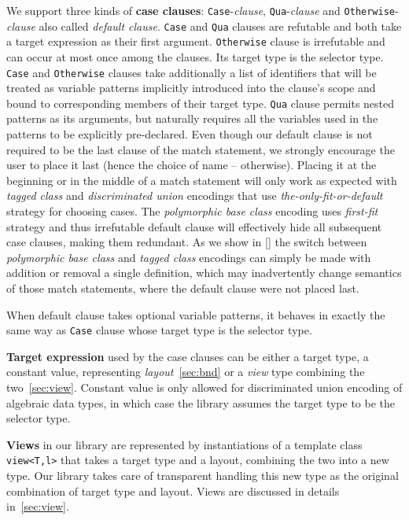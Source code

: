 \documentclass[preprint]{sigplanconf}
\makeatletter
\DeclareRobustCommand{\code}[1]{{\lstinline[breaklines=false,escapechar=@]{#1}}}
\makeatother
\begin{document}
We support three kinds of {\bf case clauses}: \code{Case}-\emph{clause}, 
\code{Qua}-\emph{clause} and \code{Otherwise}-\emph{clause} also called 
\emph{default clause}. \code{Case} and \code{Qua} clauses are refutable and both 
take a target expression as their first argument. \code{Otherwise} clause is 
irrefutable and can occur at most once among the clauses. Its target type is 
the selector type. \code{Case} and \code{Otherwise} clauses take additionally a 
list of identifiers that will be treated as variable patterns implicitly 
introduced into the clause's scope and bound to corresponding members of their 
target type. \code{Qua} clause permits nested patterns as its arguments, but 
naturally requires all the variables used in the patterns to be explicitly 
pre-declared. Even though our default clause is not required to be the last 
clause of the match statement, we strongly encourage the user to place it 
last (hence the choice of name -- otherwise). Placing it at the beginning or in 
the middle of a match statement will only work as expected with \emph{tagged 
class} and \emph{discriminated union} encodings that use 
\emph{the-only-fit-or-default} strategy for choosing cases. The 
\emph{polymorphic base class} encoding uses \emph{first-fit} strategy and thus 
irrefutable default clause will effectively hide all subsequent case 
clauses, making them redundant. As we show in \textsection\ref{} the switch 
between \emph{polymorphic base class} and \emph{tagged class} encodings can 
simply be made with addition or removal a single definition, which may 
inadvertently change semantics of those match statements, where the default 
clause were not placed last.

When default clause takes optional variable patterns, it behaves in 
exactly the same way as \code{Case} clause whose target type is the selector 
type.

{\bf Target expression} used by the case clauses can be either a target type, 
a constant value, representing \emph{layout}~\textsection\ref{sec:bnd} or a 
\emph{view} type combining the two~\textsection\ref{sec:view}. Constant value 
is only allowed for discriminated union encoding of algebraic data types, in 
which case the library assumes the target type to be the selector type.

{\bf Views} in our library are represented by instantiations of a template class 
\code{view<T,l>} that takes a target type and a layout, combining the two into a 
new type. Our library takes care of transparent handling this new type as the 
original combination of target type and layout. Views are discussed in details 
in~\textsection\ref{sec:view}.
\end{document}
